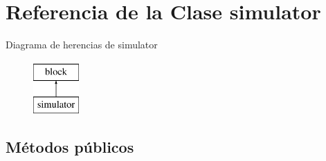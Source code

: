\hypertarget{classsimulator}{}\section{Referencia de la Clase simulator}
\label{classsimulator}
Diagrama de herencias de simulator\begin{figure}[H]
\begin{center}
\leavevmode
\includegraphics[height=2.000000cm]{classsimulator}
\end{center}
\end{figure}
\subsection*{Métodos públicos}
